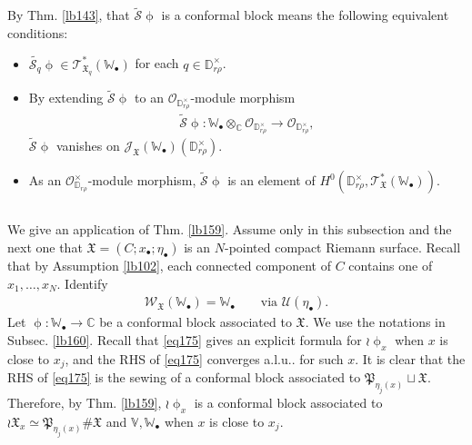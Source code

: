 \documentclass[12pt,a4paper,notitlepage]{article}
\theoremstyle{definition}
\theoremstyle{plain}
\newcommand{\fk}{\mathfrak}
\newcommand{\mc}{\mathcal}
\newcommand{\wtd}{\widetilde}
\newcommand{\scr}{\mathscr}
\newcommand{\blt}{\bullet}
\newcommand{\Vbb}{\mathbb V}
\newcommand{\Wbb}{\mathbb W}
\newcommand{\Cbb}{\mathbb C}
\newcommand{\Dbb}{\mathbb D}
\numberwithin{equation}{section}
\begin{document}
By Thm. \ref{lb143}, that $\wtd{\mc S}\upphi$ is a conformal block means the following equivalent conditions:
\begin{itemize}
\item $\wtd{\mc S_q}\upphi\in \scr T_{\fk X_q}^*(\Wbb_\blt)$ for each $q\in\Dbb_{r\rho}^\times$.
\item By extending $\wtd{\mc S}\upphi$  to an $\scr O_{\Dbb_{r\rho}^\times}$-module morphism
\begin{align}
\wtd{\mc S}\upphi:\Wbb_\blt\otimes_\Cbb\scr O_{\Dbb_{r\rho}^\times}\rightarrow \scr O_{\Dbb_{r\rho}^\times},\label{eq248}
\end{align}
$\wtd{\mc S}\upphi$ vanishes on $\scr J_{\fk X}(\Wbb_\blt)(\Dbb_{r\rho}^\times)$.
\item As an $\scr O_{\Dbb_{r\rho}}^\times$-module morphism, $\wtd{\mc S}\upphi$ is an element of $H^0(\Dbb_{r\rho}^\times,\scr T_{\fk X}^*(\Wbb_\blt))$.
\end{itemize}




\subsection{}

We give an application of Thm. \ref{lb159}. Assume only in this subsection and the next one that $\fk X=(C;x_\blt;\eta_\blt)$ is an $N$-pointed compact Riemann surface. Recall that by Assumption \ref{lb102}, each connected component of $C$ contains one of $x_1,\dots,x_N$. Identify
\begin{align}
\scr W_{\fk X}(\Wbb_\blt)=\Wbb_\blt\qquad\text{via }\mc U(\eta_\blt).\label{eq250}
\end{align}
Let $\upphi:\Wbb_\blt\rightarrow\Cbb$ be a conformal block associated to $\fk X$.  We use the notations in Subsec. \ref{lb160}. Recall that \eqref{eq175}  gives an explicit formula for $\wr\upphi_x$ when $x$ is close to $x_j$, and the RHS of \eqref{eq175} converges a.l.u.. for such $x$. It is clear that the RHS of \eqref{eq175} is the sewing of a conformal block associated to $\fk P_{\eta_j(x)}\sqcup \fk X$. Therefore, by Thm. \ref{lb159}, $\wr\upphi_x$ is a conformal block associated to $\wr\fk X_x\simeq \fk P_{\eta_j(x)}\#\fk X$ and $\Vbb,\Wbb_\blt$ when $x$ is close to $x_j$.
\end{document}
